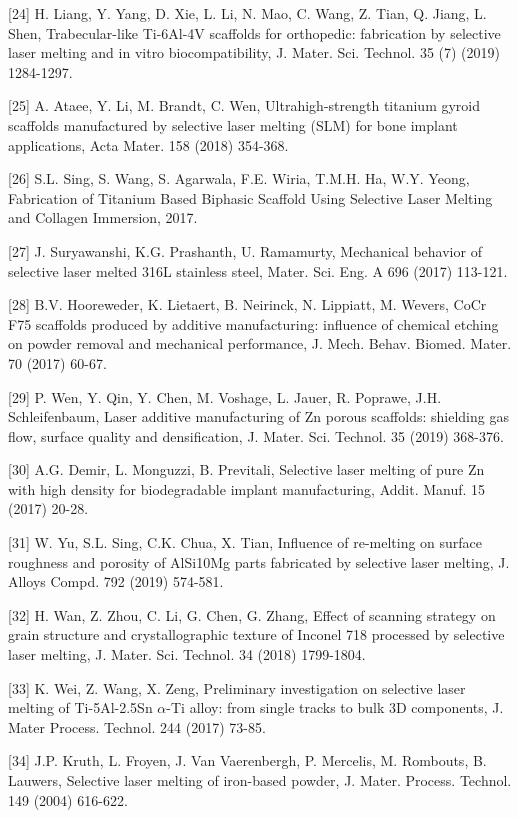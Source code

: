 \documentclass[10pt]{article}
\begin{document}
[24] H. Liang, Y. Yang, D. Xie, L. Li, N. Mao, C. Wang, Z. Tian, Q. Jiang, L. Shen, Trabecular-like Ti-6Al-4V scaffolds for orthopedic: fabrication by selective laser melting and in vitro biocompatibility, J. Mater. Sci. Technol. 35 (7) (2019) 1284-1297.

[25] A. Ataee, Y. Li, M. Brandt, C. Wen, Ultrahigh-strength titanium gyroid scaffolds manufactured by selective laser melting (SLM) for bone implant applications, Acta Mater. 158 (2018) 354-368.

[26] S.L. Sing, S. Wang, S. Agarwala, F.E. Wiria, T.M.H. Ha, W.Y. Yeong, Fabrication of Titanium Based Biphasic Scaffold Using Selective Laser Melting and Collagen Immersion, 2017.

[27] J. Suryawanshi, K.G. Prashanth, U. Ramamurty, Mechanical behavior of selective laser melted 316L stainless steel, Mater. Sci. Eng. A 696 (2017) 113-121.

[28] B.V. Hooreweder, K. Lietaert, B. Neirinck, N. Lippiatt, M. Wevers, CoCr F75 scaffolds produced by additive manufacturing: influence of chemical etching on powder removal and mechanical performance, J. Mech. Behav. Biomed. Mater. 70 (2017) 60-67.

[29] P. Wen, Y. Qin, Y. Chen, M. Voshage, L. Jauer, R. Poprawe, J.H. Schleifenbaum, Laser additive manufacturing of Zn porous scaffolds: shielding gas flow, surface quality and densification, J. Mater. Sci. Technol. 35 (2019) 368-376.

[30] A.G. Demir, L. Monguzzi, B. Previtali, Selective laser melting of pure Zn with high density for biodegradable implant manufacturing, Addit. Manuf. 15 (2017) 20-28.

[31] W. Yu, S.L. Sing, C.K. Chua, X. Tian, Influence of re-melting on surface roughness and porosity of AlSi10Mg parts fabricated by selective laser melting, J. Alloys Compd. 792 (2019) 574-581.

[32] H. Wan, Z. Zhou, C. Li, G. Chen, G. Zhang, Effect of scanning strategy on grain structure and crystallographic texture of Inconel 718 processed by selective laser melting, J. Mater. Sci. Technol. 34 (2018) 1799-1804.

[33] K. Wei, Z. Wang, X. Zeng, Preliminary investigation on selective laser melting of Ti-5Al-2.5Sn $\alpha$-Ti alloy: from single tracks to bulk 3D components, J. Mater Process. Technol. 244 (2017) 73-85.

[34] J.P. Kruth, L. Froyen, J. Van Vaerenbergh, P. Mercelis, M. Rombouts, B. Lauwers, Selective laser melting of iron-based powder, J. Mater. Process. Technol. 149 (2004) 616-622.
\end{document}
